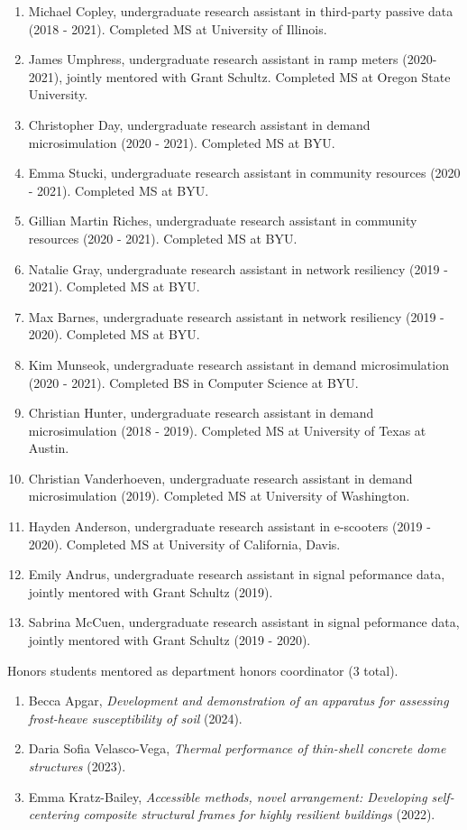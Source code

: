 \documentclass[margin,line]{res}
\newif\ifdetail
\newcounter{enuminitialize}
\newenvironment{myenum}[1][]
{%
 \setcounter{enuminitialize}{#1}
 \addtocounter{enuminitialize}{2}
 \begin{enumerate}[left= 4pt, itemsep=8pt, start=\value{enuminitialize}, label=\arabic*\addtocounter{enumi}{-2}]
}
{%
 \end{enumerate}
}
\begin{document}
\begin{resume}
\begin{myenum}[28]
  \item Michael Copley, undergraduate research assistant in third-party passive data (2018 - 2021). Completed MS at University of Illinois.
  \item James Umphress, undergraduate research assistant in ramp meters (2020-2021), jointly mentored with Grant Schultz. Completed MS at Oregon State University.
  \item Christopher Day, undergraduate research assistant in demand microsimulation (2020 - 2021). Completed MS at BYU.
  \item Emma Stucki, undergraduate research assistant in community resources (2020 - 2021). Completed MS at BYU.
  \item Gillian Martin Riches, undergraduate research assistant in community resources (2020 - 2021). Completed MS at BYU.
  \item Natalie Gray, undergraduate research assistant in network resiliency (2019 - 2021). Completed MS at BYU.
  \item Max Barnes, undergraduate research assistant in network resiliency (2019 - 2020). Completed MS at BYU.
  \item Kim Munseok, undergraduate research assistant in demand microsimulation (2020 - 2021). Completed BS in Computer Science at BYU.
  \item Christian Hunter, undergraduate research assistant in demand microsimulation (2018 - 2019). Completed MS at University of Texas at Austin.
  \item Christian Vanderhoeven, undergraduate research assistant in demand microsimulation (2019). Completed MS at University of Washington.
  \item Hayden Anderson, undergraduate research assistant in e-scooters (2019 - 2020). Completed MS at University of California, Davis.
  \item Emily Andrus, undergraduate research assistant in signal peformance data, jointly mentored with Grant Schultz (2019).
  \item Sabrina McCuen, undergraduate research assistant in signal peformance data, jointly mentored with Grant Schultz (2019 - 2020).
\end{myenum}

Honors students mentored as department honors coordinator (3 total).
\vspace{0.2cm}
\begin{myenum}[3]
  \ifdetail {\color{NavyBlue} \fi
  \item Becca Apgar, \textit{Development and demonstration of an apparatus for assessing frost-heave susceptibility of soil} (2024).
  \item Daria Sofia Velasco-Vega, \textit{Thermal performance of thin-shell concrete dome structures} (2023).
  \item Emma Kratz-Bailey, \textit{Accessible methods, novel arrangement: Developing self-centering composite structural frames for highly resilient buildings} (2022).
  \ifdetail } \fi
\end{myenum}



\end{resume}
\end{document}
